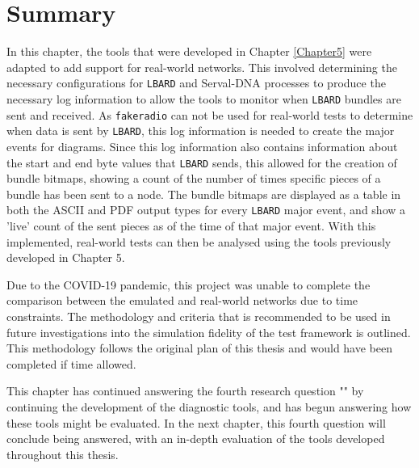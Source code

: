\section{Summary}
In this chapter, the tools that were developed in Chapter \ref{Chapter5} were adapted to add support for real-world networks.
This involved determining the necessary configurations for \texttt{LBARD} and Serval-DNA processes to produce the necessary log information to allow the tools to monitor when \texttt{LBARD} bundles are sent and received.
As \texttt{fakeradio} can not be used for real-world tests to determine when data is sent by \texttt{LBARD}, this log information is needed to create the major events for diagrams.
Since this log information also contains information about the start and end byte values that \texttt{LBARD} sends, this allowed for the creation of bundle bitmaps, showing a count of the number of times specific pieces of a bundle has been sent to a node.
The bundle bitmaps are displayed as a table in both the ASCII and PDF output types for every \texttt{LBARD} major event, and show a 'live' count of the sent pieces as of the time of that major event.
With this implemented, real-world tests can then be analysed using the tools previously developed in Chapter 5.

Due to the COVID-19 pandemic, this project was unable to complete the comparison between the emulated and real-world networks due to time constraints. 
The methodology and criteria that is recommended to be used in future investigations into the simulation fidelity of the test framework is outlined. 
This methodology follows the original plan of this thesis and would have been completed if time allowed.

This chapter has continued answering the fourth research question "\fourthRQ" by continuing the development of the diagnostic tools, and has begun answering how these tools might be evaluated.
In the next chapter, this fourth question will conclude being answered, with an in-depth evaluation of the tools developed throughout this thesis.